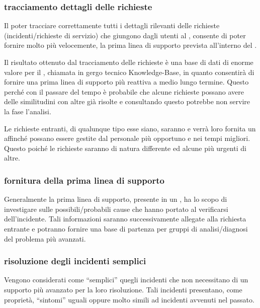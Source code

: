 \subsubsection[Tracciamento dettagli delle richieste]{tracciamento dettagli delle richieste}
Il poter tracciare correttamente tutti i dettagli rilevanti delle richieste (incidenti/richieste di servizio) che giungono dagli utenti al , consente di poter fornire molto più velocemente, la prima linea di supporto prevista all'interno del .

Il risultato ottenuto dal tracciamento delle richieste è una base di dati di enorme valore per il , chiamata in gergo tecnico \ac{Knowledge-Base}, in quanto consentirà di fornire una prima linea di supporto più reattiva a medio lungo termine. Questo perché con il passare del tempo è probabile che alcune richieste possano avere delle similitudini con altre già risolte e consultando questo  potrebbe non servire la fase l'analisi.

Le richieste entranti, di qualunque tipo esse siano, saranno  e verrà loro fornita un  affinché possano essere gestite dal personale più opportuno e nei tempi migliori. Questo poiché le richieste saranno di natura differente ed alcune più urgenti di altre.

\subsubsection[Fornitura della prima linea di supporto]{fornitura della prima linea di supporto}
Generalmente la prima linea di supporto, presente in un , ha lo scopo di investigare sulle possibili/probabili cause che hanno portato al verificarsi dell'incidente. Tali informazioni saranno successivamente allegate alla richiesta entrante e potranno fornire una base di partenza per gruppi di analisi/diagnosi del problema più avanzati.

\subsubsection[Risoluzione degli incidenti semplici]{risoluzione degli incidenti semplici}
Vengono considerati come ``semplici'' quegli incidenti che non necessitano di un supporto più avanzato per la loro risoluzione. Tali incidenti presentano, come proprietà, ``sintomi'' uguali oppure molto simili ad incidenti avvenuti nel passato.

